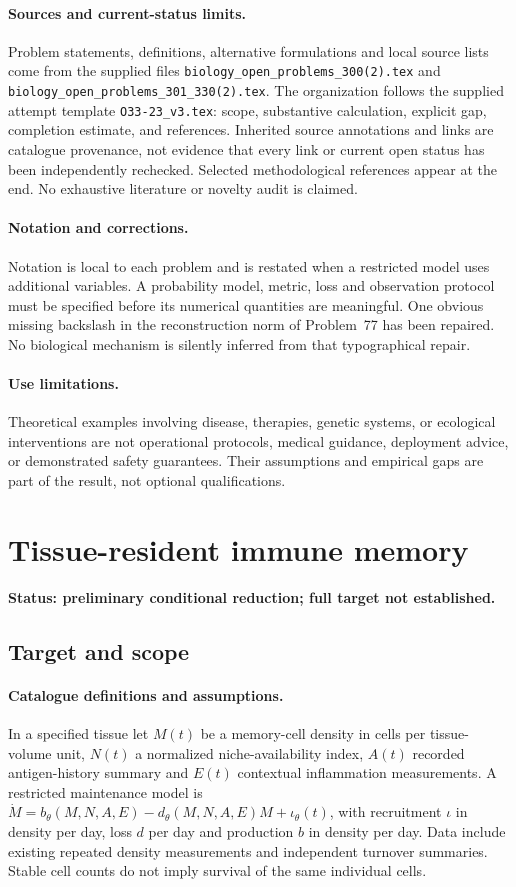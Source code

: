\documentclass[11pt]{article}
\begin{document}
\paragraph{Sources and current-status limits.}
Problem statements, definitions, alternative formulations and local source lists
come from the supplied files
\texttt{biology\_open\_problems\_300(2).tex} and
\texttt{biology\_open\_problems\_301\_330(2).tex}.
The organization follows the supplied attempt template
\texttt{O33-23\_v3.tex}: scope, substantive calculation, explicit gap,
completion estimate, and references. Inherited source annotations and links are
catalogue provenance, not evidence that every link or current open status has
been independently rechecked. Selected methodological references appear at the
end. No exhaustive literature or novelty audit is claimed.

\paragraph{Notation and corrections.}
Notation is local to each problem and is restated when a restricted model uses
additional variables. A probability model, metric, loss and observation protocol
must be specified before its numerical quantities are meaningful. One obvious
missing backslash in the reconstruction norm of Problem~77 has been repaired.
No biological mechanism is silently inferred from that typographical repair.

\paragraph{Use limitations.}
Theoretical examples involving disease, therapies, genetic systems, or ecological
interventions are not operational protocols, medical guidance, deployment advice,
or demonstrated safety guarantees. Their assumptions and empirical gaps are part
of the result, not optional qualifications.


\section*{Tissue-resident immune memory}
\label{prob:236}
\noindent\textbf{Status: preliminary conditional reduction; full target not established.}
\subsection{Target and scope}
\paragraph{Catalogue definitions and assumptions.}
In a specified tissue let $M(t)$ be a memory-cell density in cells per tissue-volume unit, $N(t)$ a normalized niche-availability index, $A(t)$ recorded antigen-history summary and $E(t)$ contextual inflammation measurements. A restricted maintenance model is $\dot M=b_\theta(M,N,A,E)-d_\theta(M,N,A,E)M+\iota_\theta(t)$, with recruitment $\iota$ in density per day, loss $d$ per day and production $b$ in density per day. Data include existing repeated density measurements and independent turnover summaries. Stable cell counts do not imply survival of the same individual cells.
\end{document}
